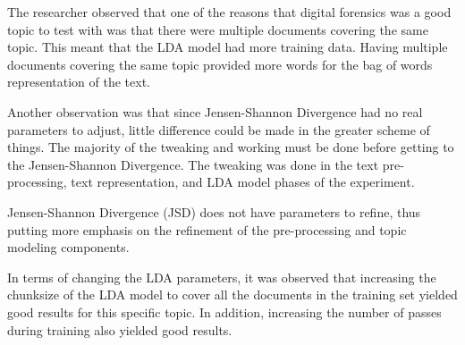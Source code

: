 \begin{table}[]
\centering
{}
\caption{Digital forensic similarity}
\label{tab:digitalforensics}
\end{table}

The researcher observed that one of the reasons that digital forensics was a good topic to test with was that there were multiple documents covering the same topic. This meant that the LDA model had more training data. Having multiple documents covering the same topic provided more words for the bag of words representation of the text.

Another observation was that since Jensen-Shannon Divergence had no real parameters to adjust, little difference could be made in the greater scheme of things. The majority of the tweaking and working must be done before getting to the Jensen-Shannon Divergence. The tweaking was done in the text pre-processing, text representation, and LDA model phases of the experiment.

\begin{lesson}
Jensen-Shannon Divergence (JSD) does not have parameters to refine, thus putting more emphasis on the refinement of the pre-processing and topic modeling components.
\end{lesson}\label{L:JSD}

In terms of changing the LDA parameters, it was observed that increasing the chunksize of the LDA model to cover all the documents in the training set yielded good results for this specific topic. In addition, increasing the number of passes during training also yielded good results.


